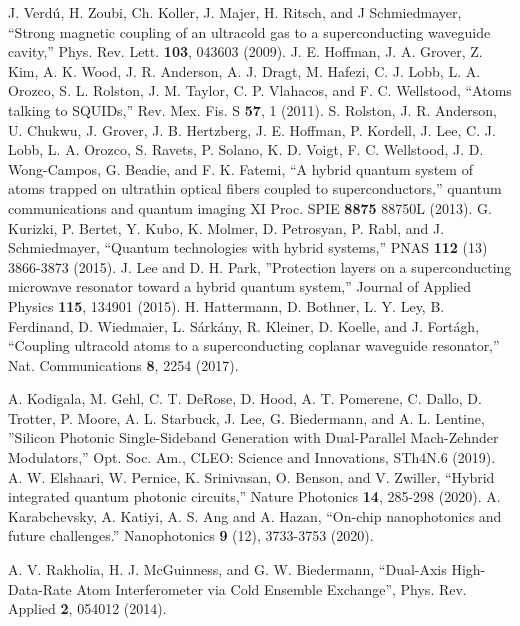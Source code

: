 \documentclass{osa-article}
\begin{document}
\begin{thebibliography}{99}
  J. Verd{\'u}, H. Zoubi, Ch. Koller, J. Majer, H. Ritsch, and J Schmiedmayer, {} ``Strong magnetic coupling of an ultracold gas to a superconducting waveguide cavity,'' Phys. Rev. Lett. \textbf{103}, 043603 (2009).
  J. E. Hoffman, J. A. Grover, Z. Kim, A. K. Wood, J. R. Anderson, A. J. Dragt, M. Hafezi, C. J. Lobb, L. A. Orozco, S. L. Rolston, J. M. Taylor, C. P. Vlahacos, and F. C. Wellstood, {} ``Atoms talking to SQUIDs,'' Rev. Mex. Fis. S \textbf{57}, 1 (2011).
 S. Rolston, J. R. Anderson, U. Chukwu, J. Grover, J. B. Hertzberg, J. E. Hoffman, P. Kordell, J. Lee, C. J. Lobb, L. A. Orozco, S. Ravets, P. Solano, K. D. Voigt, F. C. Wellstood, J. D. Wong-Campos, G. Beadie, and F. K. Fatemi, {} ``A hybrid quantum system of atoms trapped on ultrathin optical fibers coupled to superconductors,'' quantum communications and quantum imaging XI Proc. SPIE \textbf{8875} 88750L (2013).
 G. Kurizki, P. Bertet, Y. Kubo, K. Molmer, D. Petrosyan, P. Rabl, and J. Schmiedmayer, {} ``Quantum technologies with hybrid systems,'' PNAS  \textbf{112} (13) 3866-3873 (2015).
 J. Lee and D. H. Park, {} ''Protection layers on a superconducting microwave resonator toward a hybrid quantum system,'' Journal of Applied Physics \textbf{115}, 134901 (2015).
 H. Hattermann, D. Bothner, L. Y. Ley, B. Ferdinand, D. Wiedmaier, L. S{\'a}rk{\'a}ny, R. Kleiner, D. Koelle, and J. Fort{\'a}gh, {} ``Coupling ultracold atoms to a superconducting coplanar waveguide resonator,'' Nat. Communications \textbf{8}, 2254 (2017).

 A. Kodigala, M. Gehl, C. T. DeRose, D. Hood, A. T. Pomerene, C. Dallo, D. Trotter, P. Moore, A. L. Starbuck, J. Lee, G. Biedermann, and A. L. Lentine, ''Silicon Photonic Single-Sideband Generation with Dual-Parallel Mach-Zehnder Modulators,'' Opt. Soc. Am., CLEO: Science and Innovations, STh4N.6 (2019).
 A. W. Elshaari, W. Pernice, K. Srinivasan, O. Benson, and V. Zwiller, ``Hybrid integrated quantum photonic circuits,'' Nature Photonics \textbf{14}, 285-298 (2020).
 A. Karabchevsky, A. Katiyi, A. S. Ang and A. Hazan, {} ``On-chip nanophotonics and future challenges.'' Nanophotonics \textbf{9} (12), 3733-3753 (2020).

 A. V. Rakholia, H. J. McGuinness, and G. W. Biedermann, {} ``Dual-Axis High-Data-Rate Atom Interferometer via Cold Ensemble Exchange'', Phys. Rev. Applied \textbf{2}, 054012 (2014).


\end{thebibliography}
\end{document}
